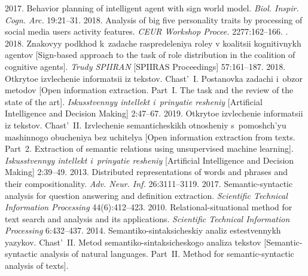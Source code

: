 \begin{multicols}{2}
{{\begin{thebibliography}{99}
   2017. Behavior planning of intelligent agent with sign world 
model. \textit{Biol. Inspir. Cogn. Arc.} 19:21--31. 
2018. Analysis of big five personality traits by processing of social media users 
activity features. \textit{CEUR Workshop Procee.} 2277:162--166.
  . 
  2018. Znakovyy podkhod k~zadache raspredeleniya 
roley v koalitsii kognitivnykh agentov [Sign-based approach to the task of role 
distribution in the coalition of cognitive agents]. \textit{Trudy SPIIRAN} [SPIIRAS 
Proceedings] 57:161--187.
   2018. 
Otkrytoe izvlechenie informatsii iz tekstov. Chast'~I. Postanovka zadachi i~obzor 
metodov [Open information extraction. Part~I. The task and the review of the state 
of the art]. \textit{Iskusstvennyy intellekt i~prinyatie resheniy} 
[Artificial Intelligence and  Decision Making] 2:47--67.
   2019. 
Otkrytoe izvlechenie informatsii iz tekstov. Chast'~II. Izvlechenie 
semanticheskikh otnosheniy s~pomoshch'yu mashinnogo obucheniya bez uchitelya 
[Open information extraction from texts. Part~2. Extraction of semantic relations 
using unsupervised machine learning]. 
\textit{Iskusstvennyy intellekt i~prinyatie resheniy} 
[Artificial Intelligence and Decision Making] 2:39--49. 
   2013. 
Distributed representations of words and phrases and their compositionality. 
\textit{Adv. Neur. Inf.} 26:3111--3119.
   2017. 
Semantic-syntactic analysis for question answering and 
definition extraction. \textit{Scientific Technical Information Processing}
44(6):412--423.
   2010. 
  Relational-situational method for text search and analysis and its applications. 
  \textit{Scientific  Technical Information Processing} 6:432--437.
   2014. 
Semantiko-sintaksicheskiy ana\-liz estestvennykh yazykov. Chast'~II. Metod 
semantiko-sintaksicheskogo analiza tekstov [Semantic-syntactic analysis of natural 
languages. Part~II. Method for semantic-syntactic analysis of texts].

\end{thebibliography}}}
\end{multicols}
